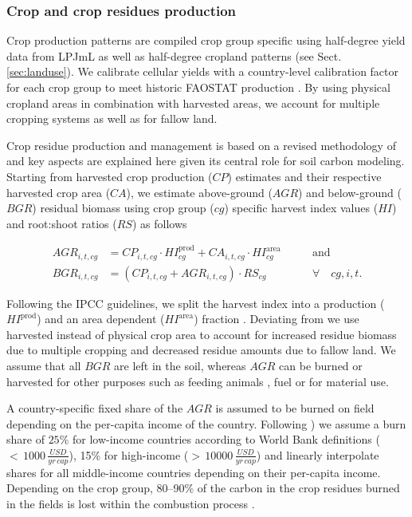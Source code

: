 \documentclass[gc, manuscript]{copernicus}
\begin{document}
\hypertarget{sec:residues}{%
\subsubsection{Crop and crop residues production}\label{sec:residues}}

Crop production patterns are compiled crop group specific using half-degree yield data from LPJmL \citep{schaphoff_lpjml4_2018} as well as half-degree cropland patterns (see Sect. \ref{sec:landuse}). We calibrate cellular yields with a country-level calibration factor for each crop group to meet historic FAOSTAT production \citep{faostat_faostat_2016}. By using physical cropland areas in combination with harvested areas, we account for multiple cropping systems as well as for fallow land.

Crop residue production and management is based on a revised methodology of \citep{bodirsky_n2o_2012} and key aspects are explained here given its central role for soil carbon modeling. Starting from harvested crop production (\(CP\)) estimates and their respective harvested crop area (\(CA\)), we estimate above-ground (\(AGR\)) and below-ground (\(BGR\)) residual biomass using crop group (\(cg\)) specific harvest index values (\(HI\)) and root:shoot ratios (\(RS\)) as follows

\begin{equation}
\begin{aligned}
AGR_{i,t,cg} & = CP_{i,t,cg} \cdot HI^{\mathrm{prod}}_{cg} + CA_{i,t,cg} \cdot HI^{\mathrm{area}}_{cg}
\qquad & \textrm{and} \\
BGR_{i,t,cg} & = (CP_{i,t,cg} + AGR_{i,t,cg}) \cdot RS_{cg} \qquad                                            & \forall\quad cg, i, t.
\label{eq:resbiomass}
\end{aligned}
\end{equation}

Following the IPCC guidelines, we split the harvest index into a production (\(HI^{\mathrm{prod}}\)) and an area dependent (\(HI^{\mathrm{area}}\)) fraction \citep{eggleston_ipcc_2006}. Deviating from \citep{bodirsky_n2o_2012} we use harvested instead of physical crop area to account for increased residue biomass due to multiple cropping and decreased residue amounts due to fallow land. We assume that all \(BGR\) are left in the soil, whereas \(AGR\) can be burned or harvested for other purposes such as feeding animals \citep{weindl_livestock_2017}, fuel or for material use.

A country-specific fixed share of the \(AGR\) is assumed to be burned on field depending on the per-capita income of the country. Following \citep{smil_nitrogen_1999}) we assume a burn share of \(25\%\) for low-income countries according to World Bank definitions (\(<\,1000\,\tfrac{USD}{yr\,cap}\)), 15\% for high-income (\(>\,10000\,\tfrac{USD}{yr\,cap}\)) and linearly interpolate shares for all middle-income countries depending on their per-capita income. Depending on the crop group, 80--90\% of the carbon in the crop residues burned in the fields is lost within the combustion process \citep{eggleston_ipcc_2006}.
\end{document}
